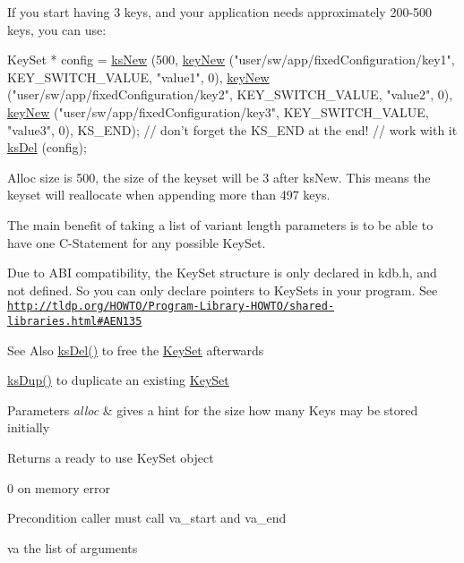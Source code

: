 If you start having 3 keys, and your application needs approximately 200-\/500 keys, you can use\-: 
\begin{DoxyCode}
KeySet * config = \hyperlink{group__keyset_ga671e1aaee3ae9dc13b4834a4ddbd2c3c}{ksNew} (500,
        \hyperlink{group__key_gaf6893c038b3ebee90c73a9ea8356bebf}{keyNew} (\textcolor{stringliteral}{"user/sw/app/fixedConfiguration/key1"}, KEY\_SWITCH\_VALUE, \textcolor{stringliteral}{
      "value1"}, 0),
        \hyperlink{group__key_gaf6893c038b3ebee90c73a9ea8356bebf}{keyNew} (\textcolor{stringliteral}{"user/sw/app/fixedConfiguration/key2"}, KEY\_SWITCH\_VALUE, \textcolor{stringliteral}{
      "value2"}, 0),
        \hyperlink{group__key_gaf6893c038b3ebee90c73a9ea8356bebf}{keyNew} (\textcolor{stringliteral}{"user/sw/app/fixedConfiguration/key3"}, KEY\_SWITCH\_VALUE, \textcolor{stringliteral}{
      "value3"}, 0),
        KS\_END); \textcolor{comment}{// don't forget the KS\_END at the end!}
\textcolor{comment}{// work with it}
\hyperlink{group__keyset_ga27e5c16473b02a422238c8d970db7ac8}{ksDel} (config);
\end{DoxyCode}
 Alloc size is 500, the size of the keyset will be 3 after ks\-New. This means the keyset will reallocate when appending more than 497 keys.

The main benefit of taking a list of variant length parameters is to be able to have one C-\/\-Statement for any possible Key\-Set.

Due to A\-B\-I compatibility, the {\ttfamily Key\-Set} structure is only declared in kdb.\-h, and not defined. So you can only declare {\ttfamily pointers} to {\ttfamily Key\-Sets} in your program. See \href{http://tldp.org/HOWTO/Program-Library-HOWTO/shared-libraries.html#AEN135}{\tt http\-://tldp.\-org/\-H\-O\-W\-T\-O/\-Program-\/\-Library-\/\-H\-O\-W\-T\-O/shared-\/libraries.\-html\#\-A\-E\-N135}

\begin{DoxySeeAlso}{See Also}
\hyperlink{group__keyset_ga27e5c16473b02a422238c8d970db7ac8}{ks\-Del()} to free the \hyperlink{group__keyset}{Key\-Set} afterwards 

\hyperlink{group__keyset_gac59e4b328245463f1451f68d5106151c}{ks\-Dup()} to duplicate an existing \hyperlink{group__keyset}{Key\-Set} 
\end{DoxySeeAlso}

\begin{DoxyParams}{Parameters}
{\em alloc} & gives a hint for the size how many Keys may be stored initially \\
\hline
\end{DoxyParams}
\begin{DoxyReturn}{Returns}
a ready to use Key\-Set object 

0 on memory error 
\end{DoxyReturn}


\begin{DoxyPrecond}{Precondition}
caller must call va\-\_\-start and va\-\_\-end 
\end{DoxyPrecond}
\begin{DoxyParagraph}{va the list of arguments}

\end{DoxyParagraph}
